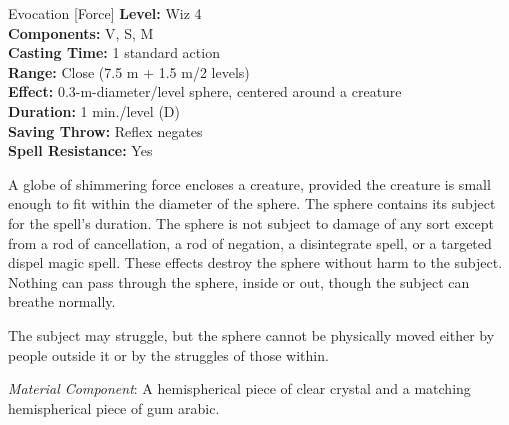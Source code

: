 {Evocation [Force]}
{
	\textbf{Level:}
	Wiz 4\\
	\textbf{Components:}
	V, S, M\\
	\textbf{Casting Time:}
	1 standard action\\
	\textbf{Range:}
	Close (7.5 m + 1.5 m/2 levels)\\
	\textbf{Effect:}
	0.3-m-diameter/level sphere, centered around a creature\\
	\textbf{Duration:}
	1 min./level (D)\\
	\textbf{Saving Throw:}
	Reflex negates\\
	\textbf{Spell Resistance:}
	Yes\\
}
{
	A globe of shimmering force encloses a creature, provided the creature is small enough to fit within the diameter of the sphere. The sphere contains its subject for the spell's duration. The sphere is not subject to damage of any sort except from a rod of cancellation, a rod of negation, a disintegrate spell, or a targeted dispel magic spell. These effects destroy the sphere without harm to the subject. Nothing can pass through the sphere, inside or out, though the subject can breathe normally.

	The subject may struggle, but the sphere cannot be physically moved either by people outside it or by the struggles of those within.

	\textit{Material Component}:
	A hemispherical piece of clear crystal and a matching hemispherical piece of gum arabic.

}
